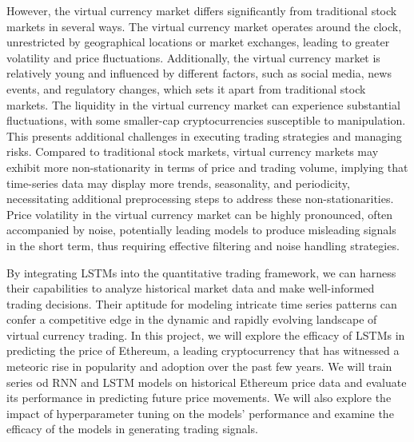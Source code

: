 \documentclass[10pt,twocolumn,letterpaper]{article}
\begin{document}
However, the virtual currency market differs significantly from traditional stock markets in several ways. The virtual currency market operates around the clock, unrestricted by geographical locations or market exchanges, leading to greater volatility and price fluctuations. Additionally, the virtual currency market is relatively young and influenced by different factors, such as social media, news events, and regulatory changes, which sets it apart from traditional stock markets. The liquidity in the virtual currency market can experience substantial fluctuations, with some smaller-cap cryptocurrencies susceptible to manipulation. This presents additional challenges in executing trading strategies and managing risks. Compared to traditional stock markets, virtual currency markets may exhibit more non-stationarity in terms of price and trading volume, implying that time-series data may display more trends, seasonality, and periodicity, necessitating additional preprocessing steps to address these non-stationarities. Price volatility in the virtual currency market can be highly pronounced, often accompanied by noise, potentially leading models to produce misleading signals in the short term, thus requiring effective filtering and noise handling strategies.

By integrating LSTMs into the quantitative trading framework, we can harness their capabilities to analyze historical market data and make well-informed trading decisions. Their aptitude for modeling intricate time series patterns can confer a competitive edge in the dynamic and rapidly evolving landscape of virtual currency trading. In this project, we will explore the efficacy of LSTMs in predicting the price of Ethereum, a leading cryptocurrency that has witnessed a meteoric rise in popularity and adoption over the past few years. We will train series od RNN and LSTM models on historical Ethereum price data and evaluate its performance in predicting future price movements. We will also explore the impact of hyperparameter tuning on the models' performance and examine the efficacy of the models in generating trading signals.
\end{document}
